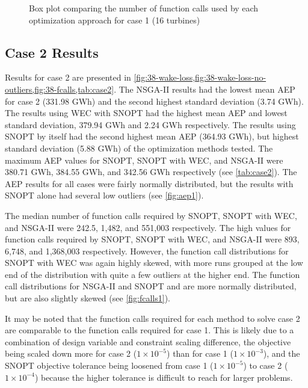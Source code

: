 \documentclass[a4paper]{jpconf}
\begin{document}
\begin{figure}[h!]
\begin{minipage}[t]{18pc}
	\caption{Box plot comparing the number of function calls used by each optimization approach for case 1 (16 turbines)}
	\label{fig:16-fcalls}
\end{minipage}
\end{figure}

\subsection{Case 2 Results}

Results for case 2 are presented in \cref{fig:38-wake-loss,fig:38-wake-loss-no-outliers,fig:38-fcalls,tab:case2}. The NSGA-II results had the lowest mean AEP for case 2 (331.98 GWh) and the second highest standard deviation (3.74 GWh). The results using WEC with SNOPT had the highest mean AEP and lowest standard deviation, 379.94 GWh and 2.24 GWh respectively. The results using SNOPT by itself had the second highest mean AEP (364.93 GWh), but highest standard deviation (5.88 GWh) of the optimization methods tested. The maximum AEP values for SNOPT, SNOPT with WEC, and NSGA-II were 380.71 GWh, 384.55 GWh, and 342.56 GWh respectively (see \cref{tab:case2}). The AEP results for all cases were fairly normally distributed, but the results with SNOPT alone had several low outliers (see \cref{fig:aep1}).

 The median number of function calls required by SNOPT, SNOPT with WEC, and NSGA-II were 242.5, 1,482, and 551,003 respectively. The high values for function calls required by SNOPT, SNOPT with WEC, and NSGA-II were 893, 6,748, and 1,368,003 respectively. However, the function call distributions for SNOPT with WEC was again highly skewed, with more runs grouped at the low end of the distribution with quite a few outliers at the higher end. The function call distributions for NSGA-II and SNOPT and are more normally distributed, but are also slightly skewed (see \cref{fig:fcalls1}).

It may be noted that the function calls required for each method to solve case 2 are comparable to the function calls required for case 1. This is likely due to a combination of design variable and constraint scaling difference, the objective being scaled down more for case 2 ($1\times10^{-5}$) than for case 1 ($1\times10^{-3}$), and the SNOPT objective tolerance being loosened from case 1 ($1\times10^{-5}$) to case 2 ($1\times10^{-4}$) because the higher tolerance is difficult to reach for larger problems.
\end{document}
